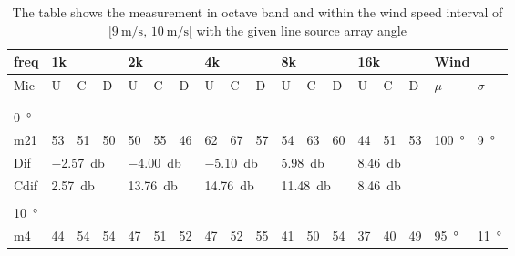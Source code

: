 \begin{table}[H]
\centering
\caption{The table shows the measurement in octave band and within the wind speed interval of $[\SI{9}{\meter\per\second},\, \SI{10}{\meter\per\second}[ $ with the given line source array angle}
\setlength\tabcolsep{5pt} %
\begin{tabular}{l|l|l|l|l|l|l|l|l|l|l|l|l|l|l|l|l|l}
freq & \multicolumn{3}{l|}{1k} & \multicolumn{3}{l|}{2k} & \multicolumn{3}{l|}{4k} & \multicolumn{3}{l|}{8k} & \multicolumn{3}{l|}{16k}   &  \multicolumn{2}{l}{Wind}                      \\ \hline
Mic  & U      & C      & D     & U      & C      & D     & U      & C      & D     & U      & C      & D     & U  & C  & D & $\mu$ & $\sigma$ \\ \hline
 & \multicolumn{3}{l|}{} & \multicolumn{3}{l|}{} & \multicolumn{3}{l|}{} & \multicolumn{3}{l|}{} & \multicolumn{3}{l|}{} &      \multicolumn{2}{l}{}                        \\ 
 \multicolumn{18}{l}{ } \\  
\SI{0}{\degree}   & \multicolumn{3}{l|}{} & \multicolumn{3}{l|}{} & \multicolumn{3}{l|}{} & \multicolumn{3}{l|}{} &  \multicolumn{3}{l|}{}   & \multicolumn{2}{l}{} \\  \hline
m21  & 53     & 51     & 50    & 50     & 55     & 46    & 62     & 67     & 57    & 54     & 63     & 60    & 44 & 51 & 53    & \SI{100}{\degree} & \SI{9}{\degree}  \\ \hline 
Dif & \multicolumn{3}{l|}{\SI{-2.57}{\decibel}} & \multicolumn{3}{l|}{\SI{-4.00}{\decibel}} & \multicolumn{3}{l|}{\SI{-5.10}{\decibel}} & \multicolumn{3}{l|}{\SI{5.98}{\decibel}} &  \multicolumn{3}{l|}{\SI{8.46}{\decibel}}  & \multicolumn{2}{l}{} \\ \hline 
Cdif & \multicolumn{3}{l|}{\SI{2.57}{\decibel}} & \multicolumn{3}{l|}{\SI{13.76}{\decibel}} & \multicolumn{3}{l|}{\SI{14.76}{\decibel}} & \multicolumn{3}{l|}{\SI{11.48}{\decibel}} & \multicolumn{3}{l|}{\SI{8.46}{\decibel}}  &   \multicolumn{2}{l}{}   \\ 
 \multicolumn{18}{l}{ } \\                             
\SI{10}{\degree}   & \multicolumn{3}{l|}{} & \multicolumn{3}{l|}{} & \multicolumn{3}{l|}{} & \multicolumn{3}{l|}{} &  \multicolumn{3}{l|}{}   & \multicolumn{2}{l}{} \\  \hline
m4    & 44     & 54     &  54    &  47    &  51    &   52   &  47    &  52     &  55    &  41     & 50     &  54    & 37 & 40 & 49   & \SI{95}{\degree} & \SI{11}{\degree}  \\

\end{tabular}
\end{table}
